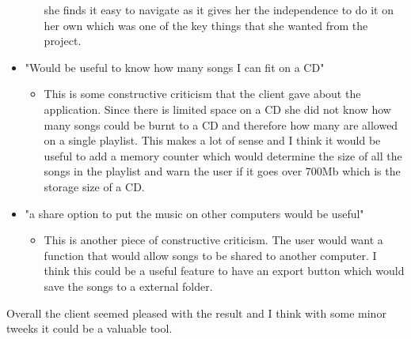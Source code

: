 \documentclass{article}
\begin{document}
\begin{itemize}
\begin{itemize}
            she finds it easy to navigate as it gives her the independence to do it on her
            own which was one of the key things that she wanted from the project.
    \end{itemize}
    \item "Would be useful to know how many songs I can fit on a CD"
    \begin{itemize}
        \item This is some constructive criticism that the client gave about the application.
            Since there is limited space on a CD she did not know how many songs could be burnt
            to a CD and therefore how many are allowed on a single playlist. This makes a lot of
            sense and I think it would be useful to add a memory counter which would determine
            the size of all the songs in the playlist and warn the user if it goes over 700Mb
            which is the storage size of a CD.
    \end{itemize}
    \item "a share option to put the music on other computers would be useful"
    \begin{itemize}
        \item This is another piece of constructive criticism. The user would want a function
            that would allow songs to be shared to another computer. I think this could be a
            useful feature to have an export button which would save the songs to a external
            folder.
    \end{itemize}
\end{itemize}

Overall the client seemed pleased with the result and I think with some minor tweeks it could
be a valuable tool.
\end{document}
